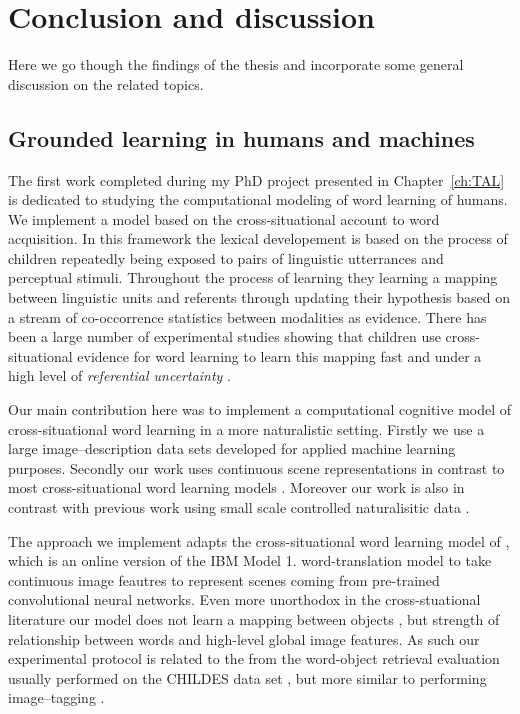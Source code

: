 \chapter{Conclusion and discussion}
\label{ch:conclusion}

Here we go though the findings of the thesis and incorporate some general discussion on the related 
topics.

\section{Grounded learning in humans and machines}
The first  work completed during my PhD project presented in Chapter~\ref{ch:TAL} is dedicated
to studying the computational modeling of word learning of humans. We implement a model based on 
the cross-situational account to word acquisition.  In this framework the lexical developement
is based on the process of children repeatedly being exposed to pairs of linguistic utterrances and 
perceptual stimuli. Throughout the process of learning they learning a mapping between linguistic 
units and referents through updating their hypothesis based on a stream of co-occorrence statistics
between modalities as evidence. There has been a large number of experimental studies showing
that children use cross-situational evidence for word learning to learn this mapping 
fast \citep{smith.yu.08} and under a high level of \emph{referential uncertainty}
\citep{vouloumanos.werker.09}. 

Our main contribution here was to implement a computational cognitive model of cross-situational
word learning in a more naturalistic setting. Firstly we use a large image--description data sets 
developed for applied machine learning purposes.  Secondly our work uses continuous scene
representations in contrast to most cross-situational word learning models  \citep{siskind.96,fontanari2009cross,fazly.etal.10,kachergis2012associative,matusevych2013automatic}. 
Moreover our work is also in contrast with previous work 
using small scale controlled naturalisitic data \citep{yu2013grounded}.
 
The approach we implement adapts the cross-situational word learning model of \citep{fazly.etal.10},
which is an online version of the IBM Model 1. word-translation model \citep{BrownPPM94} to take
continuous image feautres to represent scenes coming from pre-trained convolutional neural networks.
Even more unorthodox in the cross-stuational literature our model does not learn a mapping between objects 
\citep{fazly.etal.10,lazaridou2016multimodal}, but strength of relationship between words and high-level
global image features. As such our experimental protocol is related to the
from the word-object retrieval evaluation usually performed on the CHILDES data set \citep{goodman2008bayesian,kievit2013naturalistic,lazaridou2016multimodal}, but more similar
to performing image--tagging \citep{weston2010large}. 

